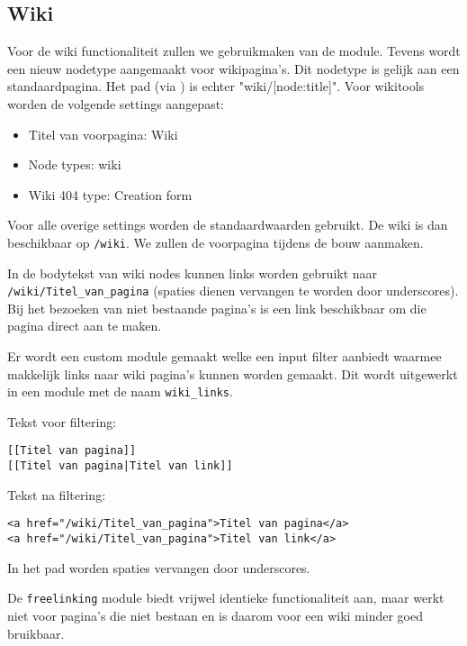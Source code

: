 \subsection{Wiki}\label{wiki}

Voor de wiki functionaliteit zullen we gebruikmaken van de  module. Tevens wordt een nieuw nodetype aangemaakt voor wikipagina's. Dit nodetype is gelijk aan een standaardpagina. Het pad (via ) is echter "wiki/[node:title]". Voor wikitools worden de volgende settings aangepast:
\begin{itemize}
\item Titel van voorpagina: Wiki
\item Node types: wiki
\item Wiki 404 type: Creation form
\end{itemize}
Voor alle overige settings worden de standaardwaarden gebruikt. De wiki is dan beschikbaar op \texttt{/wiki}. We zullen de voorpagina tijdens de bouw aanmaken.

In de bodytekst van wiki nodes kunnen links worden gebruikt naar \texttt{/wiki/Titel\_van\_pagina} (spaties dienen vervangen te worden door underscores). Bij het bezoeken van niet bestaande pagina's is een link beschikbaar om die pagina direct aan te maken.

Er wordt een custom module gemaakt welke een input filter aanbiedt waarmee makkelijk links naar wiki pagina's kunnen worden gemaakt. Dit wordt uitgewerkt in een module met de naam \texttt{wiki\_links}.

Tekst voor filtering:
\begin{verbatim}
[[Titel van pagina]]
[[Titel van pagina|Titel van link]]
\end{verbatim}
Tekst na filtering:
\begin{verbatim}
<a href="/wiki/Titel_van_pagina">Titel van pagina</a>
<a href="/wiki/Titel_van_pagina">Titel van link</a>
\end{verbatim}
In het pad worden spaties vervangen door underscores.

De \texttt{freelinking} module biedt vrijwel identieke functionaliteit aan, maar werkt niet voor pagina's die niet bestaan en is daarom voor een wiki minder goed bruikbaar.

